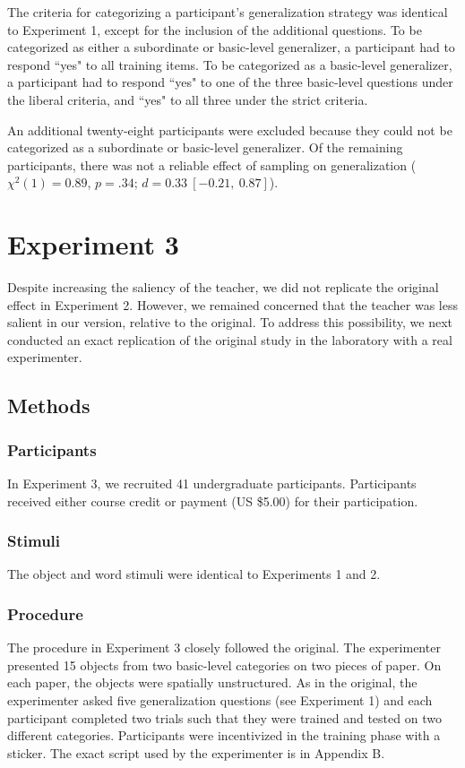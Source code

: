 \documentclass[man]{apa2}
\begin{document}
The criteria for categorizing a participant's generalization strategy was identical to Experiment 1, except for the inclusion of the additional questions. To be categorized as either a subordinate or basic-level generalizer, a participant had to respond ``yes" to all training items. To be categorized as a basic-level generalizer, a participant had to respond ``yes" to one of the three basic-level questions under the liberal criteria, and ``yes" to all three under the strict criteria. 

An additional twenty-eight participants were excluded because they could not be categorized as a subordinate or basic-level generalizer. Of the remaining participants, there was not a reliable effect of sampling on generalization ($\chi^2(1) = 0.89$,  $p = .34$; $d = 0.33\ [-0.21,\ 0.87]$).

\section{Experiment 3}
Despite increasing the saliency of the teacher, we did not replicate the original effect in Experiment 2. However, we remained  concerned that the teacher was  less salient in our version, relative to the original. To address this possibility, we next conducted an exact replication of the original study in the laboratory with a real experimenter.

\subsection{Methods}

\subsubsection{Participants}  In Experiment 3, we recruited 41 undergraduate participants. Participants received either course credit or payment (US \$5.00) for their participation. 

\subsubsection{Stimuli}
The object and word stimuli were identical to Experiments 1 and 2. 

\subsubsection{Procedure}
The procedure in Experiment 3 closely followed the original. The experimenter presented 15 objects from two basic-level categories on two pieces of paper. On each paper, the objects were spatially unstructured. As in the original, the experimenter asked five generalization questions (see Experiment 1) and  each participant completed two trials such that they were trained and tested on two different categories.  Participants were incentivized in the training phase with a sticker. The exact script used by the experimenter is in Appendix B. 
\end{document}
